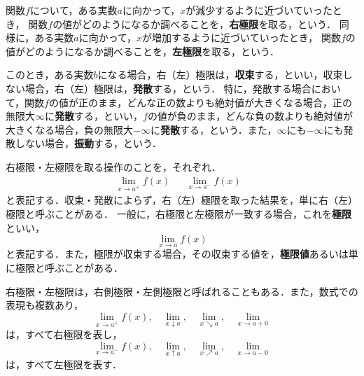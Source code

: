 \begin{definition}[極限]
	関数$f$について，ある実数$a$に向かって，$x$が減少するように近づいていったとき，
	関数$f$の値がどのようになるか調べることを，\textbf{右極限}を取る，という．
	同様に，ある実数$a$に向かって，$x$が増加するように近づいていったとき，
	関数$f$の値がどのようになるか調べることを，\textbf{左極限}を取る，という．
	
	このとき，ある実数$b$になる場合，右（左）極限は，\textbf{収束}する，といい，収束しない場合，右（左）極限は，\textbf{発散}する，という．
	特に，発散する場合において，関数$f$の値が正のまま，どんな正の数よりも絶対値が大きくなる場合，正の無限大$\infty$に\textbf{発散}する，といい，$f$の値が負のまま，どんな負の数よりも絶対値が大きくなる場合，負の無限大$-\infty$に\textbf{発散}する，という．また，$\infty$にも$-\infty$にも発散しない場合，\textbf{振動}する，という．
	
	右極限・左極限を取る操作のことを，それぞれ．
	\begin{align*}
		\lim\limits_{x \to a^+} f(x) && \lim\limits_{x \to a^-} f(x) &
	\end{align*}
	と表記する．収束・発散によらず，右（左）極限を取った結果を，単に右（左）極限と呼ぶことがある．
	一般に，右極限と左極限が一致する場合，これを\textbf{極限}といい，
	\[
		\lim\limits_{x \to a} f(x)
	\]
	と表記する\footnotemark[1]．また，極限が収束する場合，その収束する値を，\textbf{極限値}あるいは単に極限と呼ぶことがある\footnotemark[1]．
\end{definition}
\newpage
\begin{rem*}
	右極限・左極限は，右側極限・左側極限と呼ばれることもある．また，数式での表現も複数あり，
	\[
		\lim\limits_{x \to a^+} f(x),\quad \lim\limits_{x \downarrow a},\quad \lim\limits_{x \searrow a},\quad \lim\limits_{x \to a+0}
	\]
	は，すべて右極限を表し，
	\[
	\lim\limits_{x \to a^-} f(x),\quad \lim\limits_{x \uparrow a},\quad \lim\limits_{x \nearrow a},\quad \lim\limits_{x \to a-0}
	\]
	は，すべて左極限を表す．
\end{rem*}
